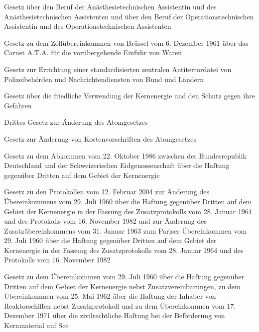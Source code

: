 \item[{ATA-OTA-G}] Gesetz über den Beruf der Anästhesietechnischen Assistentin und des Anästhesietechnischen Assistenten und über den Beruf der Operationstechnischen Assistentin und des Operationstechnischen Assistenten

\item[{ATAÜbkG}] Gesetz zu dem Zollübereinkommen von Brüssel vom 6. Dezember 1961 über das Carnet A.T.A. für die vorübergehende Einfuhr von Waren

\item[{ATDG}] Gesetz zur Errichtung einer standardisierten zentralen Antiterrordatei von Polizeibehörden und Nachrichtendiensten von Bund und Ländern

\item[{AtG}] Gesetz über die friedliche Verwendung der Kernenergie und den Schutz gegen ihre Gefahren

\item[{AtGÄndG-3}] Drittes Gesetz zur Änderung des Atomgesetzes

\item[{AtGKostÄndG}] Gesetz zur Änderung von Kostenvorschriften des Atomgesetzes

\item[{AtHaftAbkCHEG}] Gesetz zu dem Abkommen vom 22. Oktober 1986 zwischen der Bundesrepublik Deutschland und der Schweizerischen Eidgenossenschaft über die Haftung gegenüber Dritten auf dem Gebiet der Kernenergie

\item[{AtHaftProtParis2004G}] Gesetz zu den Protokollen vom 12. Februar 2004 zur Änderung des Übereinkommens vom 29. Juli 1960 über die Haftung gegenüber Dritten auf dem Gebiet der Kernenergie in der Fassung des Zusatzprotokolls vom 28. Januar 1964 und des Protokolls vom 16. November 1982 und zur Änderung des Zusatzübereinkommens vom 31. Januar 1963 zum Pariser Übereinkommen vom 29. Juli 1960 über die Haftung gegenüber Dritten auf dem Gebiet der Kernenergie in der Fassung des Zusatzprotokolls vom 28. Januar 1964 und des Protokolls vom 16. November 1982

\item[{AtHaftÜbkG}] Gesetz zu dem Übereinkommen vom 29. Juli 1960 über die Haftung gegenüber Dritten auf dem Gebiet der Kernenergie nebst Zusatzvereinbarungen, zu dem Übereinkommen vom 25. Mai 1962 über die Haftung der Inhaber von Reaktorschiffen nebst Zusatzprotokoll und zu dem Übereinkommen vom 17. Dezember 1971 über die zivilrechtliche Haftung bei der Beförderung von Kernmaterial auf See


